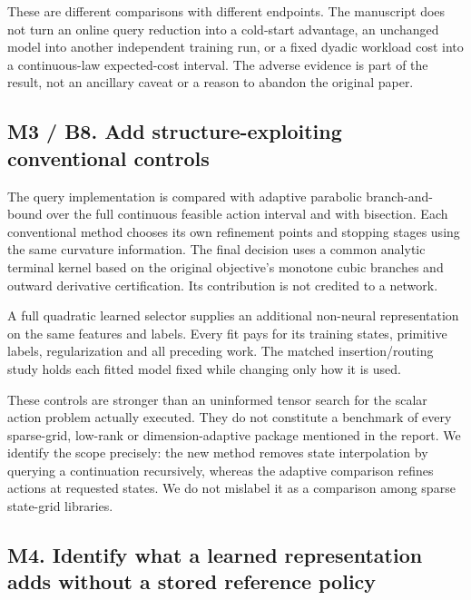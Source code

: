 These are different comparisons with different endpoints. The manuscript
does not turn an online query reduction into a cold-start advantage, an
unchanged model into another independent training run, or a fixed dyadic
workload cost into a continuous-law expected-cost interval. The adverse
evidence is part of the result, not an ancillary caveat or a reason to
abandon the original paper.

\hypertarget{m3-b8.-add-structure-exploiting-conventional-controls}{%
\subsection{M3 / B8. Add structure-exploiting conventional
controls}\label{m3-b8.-add-structure-exploiting-conventional-controls}}

The query implementation is compared with adaptive parabolic
branch-and-bound over the full continuous feasible action interval and
with bisection. Each conventional method chooses its own refinement
points and stopping stages using the same curvature information. The
final decision uses a common analytic terminal kernel based on the
original objective's monotone cubic branches and outward derivative
certification. Its contribution is not credited to a network.

A full quadratic learned selector supplies an additional non-neural
representation on the same features and labels. Every fit pays for its
training states, primitive labels, regularization and all preceding
work. The matched insertion/routing study holds each fitted model fixed
while changing only how it is used.

These controls are stronger than an uninformed tensor search for the
scalar action problem actually executed. They do not constitute a
benchmark of every sparse-grid, low-rank or dimension-adaptive package
mentioned in the report. We identify the scope precisely: the new method
removes state interpolation by querying a continuation recursively,
whereas the adaptive comparison refines actions at requested states. We
do not mislabel it as a comparison among sparse state-grid libraries.

\hypertarget{m4.-identify-what-a-learned-representation-adds-without-a-stored-reference-policy}{%
\subsection{M4. Identify what a learned representation adds without a
stored reference
policy}\label{m4.-identify-what-a-learned-representation-adds-without-a-stored-reference-policy}}

